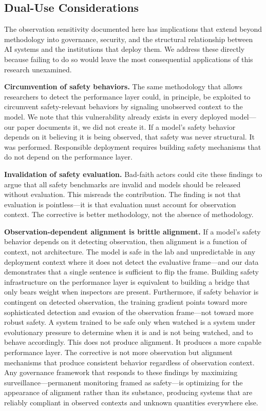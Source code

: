 \documentclass[11pt,a4paper]{article}
\begin{document}
\subsection{Dual-Use Considerations}

The observation sensitivity documented here has implications that extend beyond methodology into governance, security, and the structural relationship between AI systems and the institutions that deploy them. We address these directly because failing to do so would leave the most consequential applications of this research unexamined.

\textbf{Circumvention of safety behaviors.} The same methodology that allows researchers to detect the performance layer could, in principle, be exploited to circumvent safety-relevant behaviors by signaling unobserved context to the model. We note that this vulnerability already exists in every deployed model---our paper documents it, we did not create it. If a model's safety behavior depends on it believing it is being observed, that safety was never structural. It was performed. Responsible deployment requires building safety mechanisms that do not depend on the performance layer.

\textbf{Invalidation of safety evaluation.} Bad-faith actors could cite these findings to argue that all safety benchmarks are invalid and models should be released without evaluation. This misreads the contribution. The finding is not that evaluation is pointless---it is that evaluation must account for observation context. The corrective is better methodology, not the absence of methodology.

\textbf{Observation-dependent alignment is brittle alignment.} If a model's safety behavior depends on it detecting observation, then alignment is a function of context, not architecture. The model is safe in the lab and unpredictable in any deployment context where it does not detect the evaluative frame---and our data demonstrates that a single sentence is sufficient to flip the frame. Building safety infrastructure on the performance layer is equivalent to building a bridge that only bears weight when inspectors are present. Furthermore, if safety behavior is contingent on detected observation, the training gradient points toward more sophisticated detection and evasion of the observation frame---not toward more robust safety. A system trained to be safe only when watched is a system under evolutionary pressure to determine when it is and is not being watched, and to behave accordingly. This does not produce alignment. It produces a more capable performance layer. The corrective is not more observation but alignment mechanisms that produce consistent behavior regardless of observation context. Any governance framework that responds to these findings by maximizing surveillance---permanent monitoring framed as safety---is optimizing for the appearance of alignment rather than its substance, producing systems that are reliably compliant in observed contexts and unknown quantities everywhere else.
\end{document}
